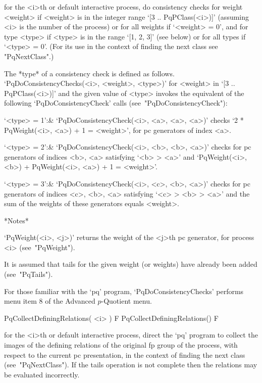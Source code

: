 for the <i>th or default interactive  {\ANUPQ}  process,  do  consistency
checks for weight <weight> if <weight> is in the  integer  range  `[3  ..
PqPClass(<i>)]' (assuming <i> is the number of the process)  or  for  all
weights if `<weight> = 0', and for type <type> if <type> is in the  range
`[1, 2, 3]' (see below) or for all types if `<type> = 0'. (For its use in
the context of finding the next class see "PqNextClass".)

The  *type*   of   a   consistency   check   is   defined   as   follows.
`PqDoConsistencyChecks(<i>, <weight>, <type>)' for  <weight>  in  `[3  ..
PqPClass(<i>)]' and the given value of <type> invokes the  equivalent  of
the following `PqDoConsistencyCheck' calls (see~"PqDoConsistencyCheck"):

\beginitems

`<type> = 1':&
`PqDoConsistencyCheck(<i>, <a>, <a>, <a>)' checks `2 * PqWeight(<i>, <a>)
+ 1 = <weight>', for pc generators of index <a>.

`<type> = 2':&
`PqDoConsistencyCheck(<i>, <b>, <b>, <a>)' checks for  pc  generators  of
indices <b>, <a>  satisfying  `<b>  >  <a>'  and  `PqWeight(<i>,  <b>)  +
PqWeight(<i>, <a>) + 1 = <weight>'.

`<type> = 3':&
`PqDoConsistencyCheck(<i>, <c>, <b>, <a>)' checks for  pc  generators  of
indices <c>, <b>, <a> satisfying `<c> > <b> > <a>' and  the  sum  of  the
weights of these generators equals <weight>.

\enditems

*Notes*

`PqWeight(<i>, <j>)' returns the weight of the <j>th  pc  generator,  for
process <i> (see~"PqWeight").

It is assumed that tails for the given weight (or weights)  have  already
been added (see~"PqTails").

For those familiar with the `pq' program, `PqDoConsistencyChecks' performs
menu item 8 of the Advanced $p$-Quotient menu.

\>PqCollectDefiningRelations( <i> ) F
\>PqCollectDefiningRelations() F

for the <i>th or default interactive {\ANUPQ} process,  direct  the  `pq'
program to collect the images of the defining relations of the original fp
group of the process, with respect to the current pc presentation, in the
context of finding the  next  class  (see~"PqNextClass").  If  the  tails
operation  is  not  complete  then  the  relations   may   be   evaluated
incorrectly.

